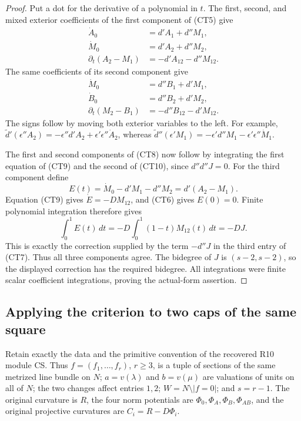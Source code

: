 \begin{proof}
Put a dot for the derivative of a polynomial in $t$.  The first,
second, and mixed exterior coefficients of the first component of
(CT5) give
\[
 \begin{split}
 \dot A_0&=d'A_1+d''M_1,\\
 \dot M_0&=d'A_2+d''M_2,\\
 \partial_t(A_2-M_1)&=-d'A_{12}-d''M_{12}.
 \end{split}
 \tag{CT9}
\]
The same coefficients of its second component give
\[
 \begin{split}
 \dot M_0&=d''B_1+d'M_1,\\
 \dot B_0&=d''B_2+d'M_2,\\
 \partial_t(M_2-B_1)&=-d''B_{12}-d'M_{12}.
 \end{split}
 \tag{CT10}
\]
The signs follow by moving both exterior variables to the left.
For example,
$\widetilde d'(\epsilon''A_2)
 =-\epsilon''d'A_2+\epsilon'\epsilon''\dot A_2$, whereas
$\widetilde d''(\epsilon'M_1)
 =-\epsilon'd''M_1-\epsilon'\epsilon''\dot M_1$.

The first and second components of (CT8) now follow by integrating
the first equation of (CT9) and the second of (CT10), since
$d''d''J=0$.  For the third component define
\[
 E(t)=\dot M_0-d'M_1-d''M_2=d'(A_2-M_1).
 \tag{CT11}
\]
Equation (CT9) gives $\dot E=-DM_{12}$, and (CT6) gives $E(0)=0$.
Finite polynomial integration therefore gives
\[
 \int_0^1E(t)\,dt
    =-D\int_0^1(1-t)M_{12}(t)\,dt=-DJ.
 \tag{CT12}
\]
This is exactly the correction supplied by the term $-d''J$
in the third entry of (CT7).  Thus all three components agree.
The bidegree of $J$ is $(s-2,s-2)$, so the displayed correction
has the required bidegree.  All integrations were finite scalar
coefficient integrations, proving the actual-form assertion.
\end{proof}

\subsection{Applying the criterion to two caps of the same square}

Retain exactly the data and the primitive convention of the recovered
R10 module CS.  Thus $f=(f_1,\ldots,f_r)$, $r\ge3$, is a tuple
of sections of the same metrized line bundle on $N$; $a=v(\lambda)$
and $b=v(\mu)$ are valuations of units on all of $N$; the two
changes affect entries $1,2$; $W=N\setminus|f=0|$; and $s=r-1$.
The original curvature is $R$, the four norm potentials are
$\Phi_0,\Phi_A,\Phi_B,\Phi_{AB}$, and the original projective
curvatures are $C_i=R-D\Phi_i$.

